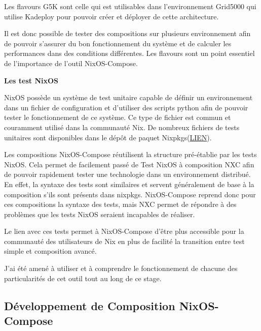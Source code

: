 \documentclass[a4paper,french,12pt, titlepage]{article}
\begin{document}
Les flavours G5K sont celle qui est utilisables dans l'environnement
Grid5000 qui utilise Kadeploy \cite{kadeploy2011} pour pouvoir créer et
déployer de cette architecture.\newline

Il est donc possible de tester des compositions sur plusieurs
environnement afin de pouvoir s'assurer du bon fonctionnement du système
et de calculer les performances dans des conditions différentes. Les
flavours sont un point essentiel de l'importance de l'outil
NixOS-Compose.\newline

\textbf{Les test NixOS}\newline

NixOS possède un système de test unitaire capable de définir un
environnement dans un fichier de configuration et d'utiliser des scripts
python afin de pouvoir tester le fonctionnement de ce système. Ce type
de fichier est commun et couramment utilisé dans la communauté Nix. De
nombreux fichiers de tests unitaires sont disponibles dans le dépôt de
paquet
Nixpkgs(\href{https://github.com/NixOS/nixpkgs/tree/master/nixos/tests}{LIEN}).\newline

Les compositions NixOS-Compose réutilisent la structure pré-établie par
les tests NixOS. Cela permet de facilement passé de Test NixOS à
composition NXC afin de pouvoir rapidement tester une technologie dans
un environnement distribué. En effet, la syntaxe des tests sont
similaires et servent généralement de base à la composition s'ils sont
présents dans nixpkgs. NixOS-Compose reprend donc pour ces compositions
la syntaxe des tests, mais NXC permet de répondre à des problèmes que
les tests NixOS seraient incapables de réaliser.\newline

Le lien avec ces tests permet à NixOS-Compose d'être plus accessible
pour la communauté des utilisateurs de Nix en plus de facilité la
transition entre test simple et composition avancé.\newline

J'ai été amené à utiliser et à comprendre le fonctionnement de chacune
des particularités de cet outil tout au long de ce stage.\newline

\newpage

\hypertarget{duxe9veloppement-de-composition-nixos-compose}{%
\subsection{Développement de Composition
NixOS-Compose}\label{duxe9veloppement-de-composition-nixos-compose}}
\end{document}

